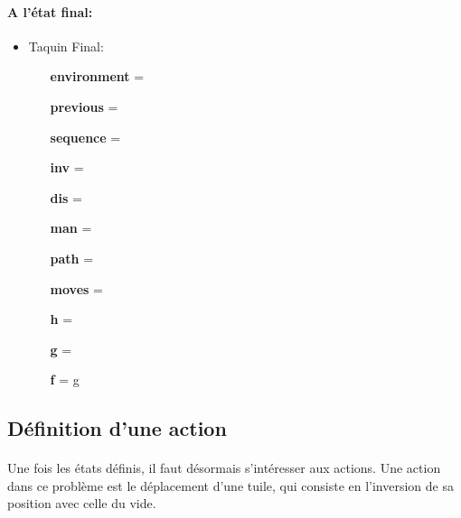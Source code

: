 \documentclass[10pt,a4paper]{report}
\begin{document}
\paragraph{A l’état final:}
\begin{itemize}
\item Taquin Final:
\begin{itemize}
\item [{\ttfamily\bfseries environment} =] {\color{gray}{\em L'environnement est toujours le même, seul l'état final est ajouté à la liste \ttfamily end}}
\item [{\ttfamily\bfseries previous} =] {\color{gray}{\em L'avant-dernier état}}
\item [{\ttfamily\bfseries sequence} =] {\ttfamily [1, 2, 3, 4, 5, 6, 7, 8, 0]}
\item [{\ttfamily\bfseries inv} =] {}
\item [{\ttfamily\bfseries dis} =] {}
\item [{\ttfamily\bfseries man} =] {}
\item [{\ttfamily\bfseries path} =] {\color{gray}{\em Le chemin minimal depuis l'état initial jusqu'à cet état}}
\item [{\ttfamily\bfseries moves} =] {\ttfamily ["R"]}
\item [{\ttfamily\bfseries h} =] {}
\item [{\ttfamily\bfseries g} =] {\color{gray}{\em La longueur du chemin minimal}}
\item [{\ttfamily\bfseries f} =] {\ttfamily g}
\end{itemize}
\end{itemize}
\subsection{Définition d’une action}
\paragraph{}{Une fois les états définis, il faut désormais s’intéresser aux actions. Une action dans ce problème est le déplacement d’une tuile, qui consiste en l'inversion de sa position avec celle du vide.}
\end{document}
